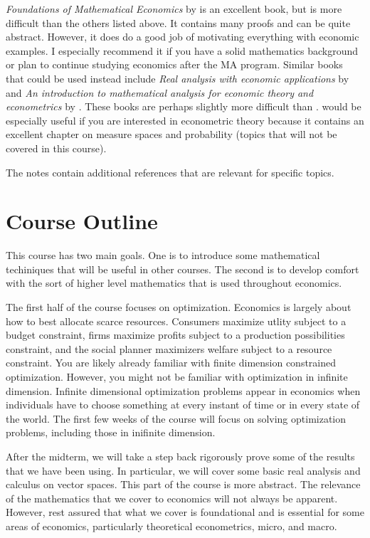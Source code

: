 \documentclass[10pt]{article}
\renewcommand{\cite}{\citet}
\begin{document}
\textit{Foundations of Mathematical Economics} by \cite{carter2001} is
an excellent book, but is more difficult than the others listed
above. It contains many proofs and can be quite abstract. However, it
does do a good job of motivating everything with economic examples. I
especially recommend it if you have a solid mathematics background or
plan to continue studying economics after the MA program. Similar
books that could be used instead include \textit{Real analysis with
  economic applications} by \cite{ok2007} and \textit{An introduction
  to mathematical analysis for economic theory and econometrics} by
\cite{corbae2009}. These books are perhaps slightly more difficult
than \cite{carter2001}. \cite{corbae2009} would be especially useful
if you are interested in econometric theory because it contains an
excellent chapter on measure spaces and probability (topics that will
not be covered in this course).
 
The notes contain additional references that are relevant for specific
topics.

\section{Course Outline}

This course has two main goals. One is to introduce some mathematical
techiniques that will be useful in other courses. The second is to
develop comfort with the sort of higher level mathematics that is used
throughout economics. 

The first half of the course focuses on optimization. Economics is
largely about how to best allocate scarce resources. Consumers
maximize utlity subject to a budget constraint, firms maximize profits
subject to a production possibilities constraint, and the social
planner maximizers welfare subject to a resource constraint. You are
likely already familiar with finite dimension constrained
optimization. However, you might not be familiar with optimization in
infinite dimension. Infinite dimensional optimization problems appear
in economics when individuals have to choose something at every
instant of time or in every state of the world. The first few weeks of
the course will focus on solving optimization problems, including
those in inifinite dimension. 

After the midterm, we will take a step back rigorously prove some of
the results that we have been using. In particular, we will cover some
basic real analysis and calculus on vector spaces. This part of the
course is more abstract. The relevance of the mathematics that we
cover to economics will not always be apparent. However, rest assured
that what we cover is foundational and is essential for some areas of
economics, particularly theoretical econometrics, micro, and macro. 
\end{document}
